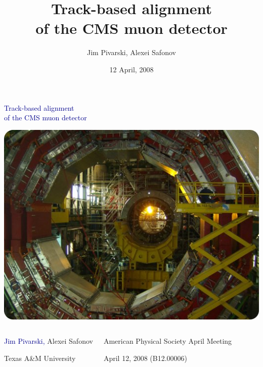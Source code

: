 \documentclass[compress]{beamer}
\title{Track-based alignment \\ of the CMS muon detector}
\author{Jim Pivarski, Alexei Safonov}
\institute{Texas A\&M University}
\date{12 April, 2008}
\begin{document}
\begin{frame}
\begin{center}
\textcolor{darkblue}{\LARGE Track-based alignment \\ of the CMS muon detector}

\vfill \vfill \includegraphics[width=0.6\linewidth]{sun_shines_in_the_muon_barrel.jpg}

\end{center}
\begin{columns}
\begin{center}
\textcolor{darkblue}{Jim Pivarski,} Alexei Safonov

\small Texas A\&M University
\end{center}

\begin{center}
\scriptsize American Physical Society April Meeting

April 12, 2008 (B12.00006)
\end{center}
\end{columns}
\end{frame}

\end{document}
